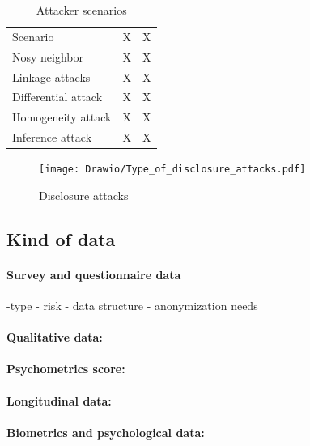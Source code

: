 \documentclass{article}
\begin{document}
\begin{table}[H]
    \centering
    \begin{tabular}{lcc}
        Scenario & X & X \\
        Nosy neighbor & X & X \\
        Linkage attacks & X & X \\
        Differential attack & X & X \\
        Homogeneity attack & X & X \\
        Inference attack & X & X \\
    \end{tabular}
    \caption{Attacker scenarios}
    \label{tab:tab1}
\end{table}


\begin{figure}[H]
    \centering
    \texttt{[image: Drawio/Type\_of\_disclosure\_attacks.pdf]}
    \caption{Disclosure attacks}
    \label{fig:Disclosure_attacks}
\end{figure}

\subsection{Kind of data}

\paragraph{Survey and questionnaire data}
-type
- risk
- data structure
- anonymization needs

\paragraph{Qualitative data:}

\paragraph{Psychometrics score:}

\paragraph{Longitudinal data:}

\paragraph{Biometrics and psychological data:}
\end{document}
